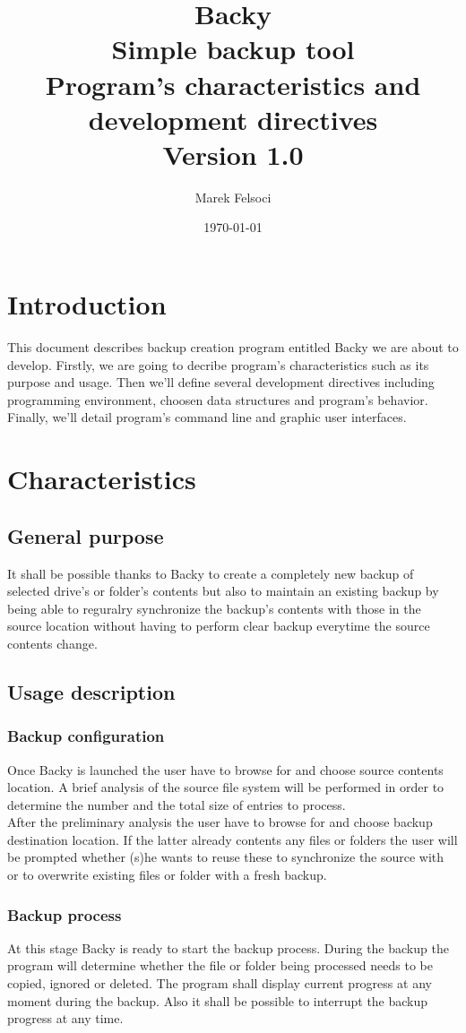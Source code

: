 \documentclass[a4paper]{article}
\title{
  Backy \\
  \Large Simple backup tool \\
  \large Program's characteristics and development directives \\
  \normalsize Version 1.0
}
\author{Marek Felsoci}
\date{\today}
\begin{document}
  \maketitle
  \tableofcontents
  \section{Introduction}
    This document describes backup creation program entitled Backy we are about to develop. Firstly, we are going to decribe program's characteristics such as its purpose and usage. Then we'll define several development directives including programming environment, choosen data structures and program's behavior. Finally, we'll detail program's command line and graphic user interfaces.
  \section{Characteristics}
    \subsection{General purpose}
      It shall be possible thanks to Backy to create a completely new backup of selected drive's or folder's contents but also to maintain an existing backup by being able to reguralry synchronize the backup's contents with those in the source location without having to perform clear backup everytime the source contents change.
    \subsection{Usage description}
      \subsubsection{Backup configuration}
        Once Backy is launched the user have to browse for and choose source contents location. A brief analysis of the source file system will be performed in order to determine the number and the total size of entries to process. \\
        \indent After the preliminary analysis the user have to browse for and choose backup destination location. If the latter already contents any files or folders the user will be prompted whether (s)he wants to reuse these to synchronize the source with or to overwrite existing files or folder with a fresh backup. \\
      \subsubsection{Backup process}
        At this stage Backy is ready to start the backup process. During the backup the program will determine whether the file or folder being processed needs to be copied, ignored or deleted. The program shall display current progress at any moment during the backup. Also it shall be possible to interrupt the backup progress at any time. \\
\end{document}
